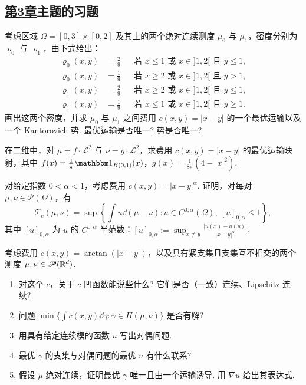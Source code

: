 \subsection*{\hyperref[sec:3]{第3章}主题的习题}
\begin{exercise}\label{ex:12}
考虑区域 $\Omega=[0,3]\times[0,2]$ 及其上的两个绝对连续测度 $\mu_0$ 与 $\mu_1$，密度分别为 $\varrho_0$ 与 $\varrho_1$，由下式给出：
\[
\begin{aligned}
\varrho_0(x,y)&=\frac29&&\text{若 }x\leq1\text{ 或 }x\in ]1,2[\text{ 且 }y\leq1,\\
\varrho_0(x,y)&=\frac19&&\text{若 }x\geq2\text{ 或 }x\in ]1,2[\text{ 且 }y>1,\\
\varrho_1(x,y)&=\frac29&&\text{若 }x\geq2\text{ 或 }x\in ]1,2[\text{ 且 }y\leq1,\\
\varrho_1(x,y)&=\frac19&&\text{若 }x\leq1\text{ 或 }x\in ]1,2[\text{ 且 }y\geq1.
\end{aligned}
\]
画出这两个密度，并求 $\mu_0$ 与 $\mu_1$ 之间费用 $c(x,y)=|x-y|$ 的一个最优运输以及一个 Kantorovich 势. 最优运输是否唯一? 势是否唯一?
\end{exercise}

\begin{exercise}\label{ex:13}
在二维中，对 $\mu=f\cdot\mathscr L^2$ 与 $\nu=g\cdot\mathscr L^2$，求费用 $c(x,y)=|x-y|$ 的最优运输映射，其中 $f(x)=\frac1\pi\mathbbm1_{B(0,1)}(x)$，$g(x)=\frac1{8\pi}(4-|x|^2)$.
\end{exercise}

\begin{exercise}\label{ex:14}
对给定指数 $0<\alpha<1$，考虑费用 $c(x,y)=|x-y|^\alpha$. 证明，对每对 $\mu,\nu\in\mathscr P(\Omega)$，有
\[
\mathscr T_c(\mu,\nu)=\sup\left\{\int u\dd(\mu-\nu):
u\in C^{0,\alpha}(\Omega),\ [u]_{0,\alpha}\leq1\right\},
\]
其中 $[u]_{0,\alpha}$ 为 $u$ 的 $C^{0,\alpha}$ 半范数：$[u]_{0,\alpha}:=\sup_{x\neq y}\frac{|u(x)-u(y)|}{|x-y|^\alpha}$.
\end{exercise}

\begin{exercise}\label{ex:15}
考虑费用 $c(x,y)=\arctan(|x-y|)$，以及具有紧支集且支集互不相交的两个测度 $\mu,\nu\in\mathscr P(\mathbb R^d)$.
\begin{enumerate}
\item 对这个 $c$，关于 $c$-凹函数能说些什么? 它们是否（一致）连续、Lipschitz 连续?
\item 问题 $\min\{\int c(x,y)\dd\gamma:\gamma\in\Pi(\mu,\nu)\}$ 是否有解?
\item 用具有给定连续模的函数 $u$ 写出对偶问题.
\item 最优 $\gamma$ 的支集与对偶问题的最优 $u$ 有什么联系?
\item 假设 $\mu$ 绝对连续，证明最优 $\gamma$ 唯一且由一个运输诱导. 用 $\nabla u$ 给出其表达式.
\end{enumerate}
\end{exercise}

